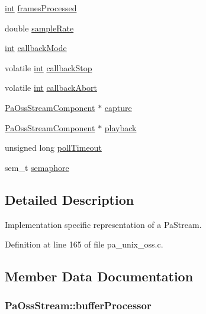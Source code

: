 \begin{DoxyCompactItemize}
\item 
\hyperlink{xmltok_8h_a5a0d4a5641ce434f1d23533f2b2e6653}{int} \hyperlink{struct_pa_oss_stream_a3710a34d8822deb12fb6edcfc1abc6c9}{frames\+Processed}
\item 
double \hyperlink{struct_pa_oss_stream_a43cf201ba8bace361a7c34ecf707c8cd}{sample\+Rate}
\item 
\hyperlink{xmltok_8h_a5a0d4a5641ce434f1d23533f2b2e6653}{int} \hyperlink{struct_pa_oss_stream_a20a58bc0a5255b639b1ea40fce962261}{callback\+Mode}
\item 
volatile \hyperlink{xmltok_8h_a5a0d4a5641ce434f1d23533f2b2e6653}{int} \hyperlink{struct_pa_oss_stream_af8fd6b50f04c65318fbc6ed298cc9520}{callback\+Stop}
\item 
volatile \hyperlink{xmltok_8h_a5a0d4a5641ce434f1d23533f2b2e6653}{int} \hyperlink{struct_pa_oss_stream_a27bbffabcaa98b6302ffa2dbd1836f1a}{callback\+Abort}
\item 
\hyperlink{struct_pa_oss_stream_component}{Pa\+Oss\+Stream\+Component} $\ast$ \hyperlink{struct_pa_oss_stream_a8f72686fa2b8f688bb41363c6dcf097c}{capture}
\item 
\hyperlink{struct_pa_oss_stream_component}{Pa\+Oss\+Stream\+Component} $\ast$ \hyperlink{struct_pa_oss_stream_ad0a29997c2144457023c2557357418fd}{playback}
\item 
unsigned long \hyperlink{struct_pa_oss_stream_a0640a35e51badac6cb590bf436749766}{poll\+Timeout}
\item 
sem\+\_\+t \hyperlink{struct_pa_oss_stream_ae7d78176c917f2ca1ee2fc9a55ef833e}{semaphore}
\end{DoxyCompactItemize}


\subsection{Detailed Description}
Implementation specific representation of a Pa\+Stream. 

Definition at line 165 of file pa\+\_\+unix\+\_\+oss.\+c.



\subsection{Member Data Documentation}
\subsubsection[{\texorpdfstring{buffer\+Processor}{bufferProcessor}}]{ Pa\+Oss\+Stream\+::buffer\+Processor}\hypertarget{struct_pa_oss_stream_a0b2602b258a473831c538c58b568a0f6}{}\label{struct_pa_oss_stream_a0b2602b258a473831c538c58b568a0f6}


